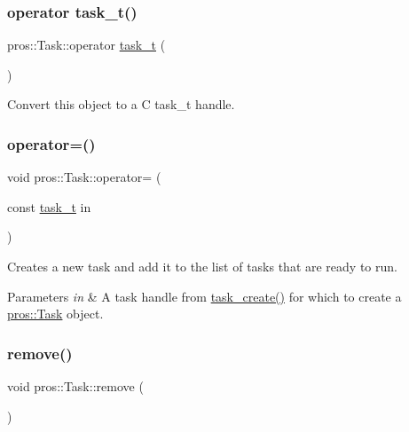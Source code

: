 \subsubsection{\texorpdfstring{operator task\+\_\+t()}{operator task\_t()}}
{\footnotesize\ttfamily pros\+::\+Task\+::operator \hyperlink{rtos_8h_a1d7e0825b8d8876e8cd8ece3f9115293}{task\+\_\+t} (\begin{DoxyParamCaption}{ }\end{DoxyParamCaption})\hspace{0.3cm}{\ttfamily [inline]}}



Convert this object to a C task\+\_\+t handle. 

\mbox{\label{classpros_1_1Task_aaaeae2788114241e149317248998781e}} 
\subsubsection{\texorpdfstring{operator=()}{operator=()}}
{\footnotesize\ttfamily void pros\+::\+Task\+::operator= (\begin{DoxyParamCaption}\item[{const \hyperlink{rtos_8h_a1d7e0825b8d8876e8cd8ece3f9115293}{task\+\_\+t}}]{in }\end{DoxyParamCaption})}



Creates a new task and add it to the list of tasks that are ready to run. 


\begin{DoxyParams}{Parameters}
{\em in} & A task handle from \hyperlink{rtos_8h_a2e3ed8f26b8c1edcff493bc583f0a76a}{task\+\_\+create()} for which to create a \hyperlink{classpros_1_1Task}{pros\+::\+Task} object. \\
\hline
\end{DoxyParams}
\mbox{\label{classpros_1_1Task_a45269807dfc87bb1d5e9580346793e9d}} 
\subsubsection{\texorpdfstring{remove()}{remove()}}
{\footnotesize\ttfamily void pros\+::\+Task\+::remove (\begin{DoxyParamCaption}{ }\end{DoxyParamCaption})}



